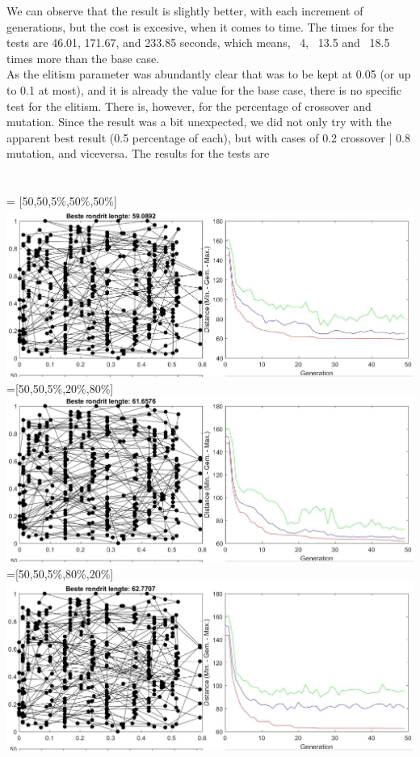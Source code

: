 We can observe that the result is slightly better, with each increment of
generations, but the cost is excesive, when it comes to time. The times for the
tests are 46.01, 171.67, and 233.85 seconds, which means, ~4, ~13.5 and ~18.5
times more than the base case.
\\
As the elitism parameter was abundantly clear that was to be kept at 0.05 (or
up to 0.1 at most), and it is already the value for the base case, there is
no specific test for the elitism. There is, however, for the percentage of
crossover and mutation. Since the result was a bit unexpected, we did not only
try with the apparent best result (0.5 percentage of each), but with cases of
0.2 crossover | 0.8 mutation, and viceversa. The results for the tests are\\
\\
\\
 = [50,50,5\%,50\%,50\%] \\
\includegraphics[width=\textwidth]{img/specific/xalt_edges/general_6.jpg}\\
 =[50,50,5\%,20\%,80\%] \\
\includegraphics[width=\textwidth]{img/specific/xalt_edges/general_7.jpg}\\
 =[50,50,5\%,80\%,20\%] \\
\includegraphics[width=\textwidth]{img/specific/xalt_edges/general_8.jpg}\\
